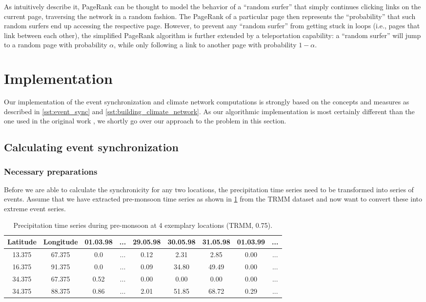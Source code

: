 As \citet{Page.1999} intuitively describe it, PageRank can be thought to model the behavior of a ``random surfer'' that simply continues clicking links on the current page, traversing the network in a random fashion. The PageRank of a particular page then represents the ``probability'' that such random surfers end up accessing the respective page. However, to prevent any ``random surfer'' from getting stuck in loops (i.e., pages that link between each other), the simplified PageRank algorithm is further extended by a teleportation capability: a ``random surfer'' will jump to a random page with probability $\alpha$, while only following a link to another page with probability $1-\alpha$.


\section{Implementation}
\label{st:event_sync_implementation}
Our implementation of the event synchronization and climate network computations is strongly based on the concepts and measures as described in \cref{sst:event_sync} and \cref{sst:building_climate_network}. As our algorithmic implementation is most certainly different than the one used in the original work \citep{Stolbova.2015}, we shortly go over our approach to the problem in this section.

\subsection{Calculating event synchronization}
\label{sst:event_sync_calculation}

\subsubsection{Necessary preparations}
Before we are able to calculate the synchronicity for any two locations, the precipitation time series need to be transformed into series of events. Assume that we have extracted pre-monsoon time series as shown in \cref{tab:example_rainfall_ts} from the TRMM dataset and now want to convert these into extreme event series.

\begin{table}[h]
  \centering
  \begin{tabular}{ |c|c|ccccccc| }
    \hline
    Latitude & Longitude & 01.03.98 & ... & 29.05.98 & 30.05.98 & 31.05.98 & 01.03.99 & ...\\
    \hline
    13.375 & 67.375 & 0.0  & ... & 0.12 & 2.31  & 2.85  & 0.00 & ... \\
    16.375 & 91.375 & 0.0  & ... & 0.09 & 34.80 & 49.49 & 0.00 & ... \\
    34.375 & 67.375 & 0.52 & ... & 0.00 & 0.00  & 0.00  & 0.00 & ... \\
    34.375 & 88.375 & 0.86 & ... & 2.01 & 51.85 & 68.72 & 0.29 & ... \\
    \hline
  \end{tabular}
  \caption{Precipitation time series during pre-monsoon at 4 exemplary locations (TRMM, 0.75\degree).}
  \label{tab:example_rainfall_ts}
\end{table}

